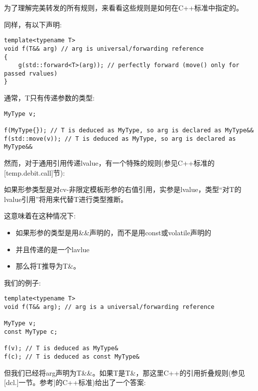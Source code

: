 为了理解完美转发的所有规则，来看看这些规则是如何在C++标准中指定的。\par

同样，有以下声明:\par

\begin{lstlisting}[caption={}]
template<typename T>
void f(T&& arg) // arg is universal/forwarding reference
{
	g(std::forward<T>(arg)); // perfectly forward (move() only for passed rvalues)
}
\end{lstlisting}

通常，T只有传递参数的类型:\par

\begin{lstlisting}[caption={}]
MyType v;

f(MyType{}); // T is deduced as MyType, so arg is declared as MyType&&
f(std::move(v)); // T is deduced as MyType, so arg is declared as MyType&&
\end{lstlisting}

然而，对于通用引用传递lvalue，有一个特殊的规则(参见C++标准的[temp.debit.call]节):\par

如果形参类型是对cv-非限定模板形参的右值引用，实参是lvalue，类型“对T的lvalue引用”将用来代替T进行类型推断。\par

\par

这意味着在这种情况下:\par

\begin{itemize}
	\item 如果形参的类型是用\&\&声明的，而不是用const或volatile声明的
	\item 并且传递的是一个lavlue
	\item 那么将T推导为T\&。
\end{itemize}

我们的例子:\par

\begin{lstlisting}[caption={}]
template<typename T>
void f(T&& arg); // arg is a universal/forwarding reference

MyType v;
const MyType c;

f(v); // T is deduced as MyType&
f(c); // T is deduced as const MyType&
\end{lstlisting}

但我们已经将arg声明为T\&\&。如果T是T\&，那这里C++的引用折叠规则(参见[dcl.]一节。参考]的C++标准)给出了一个答案:\par

